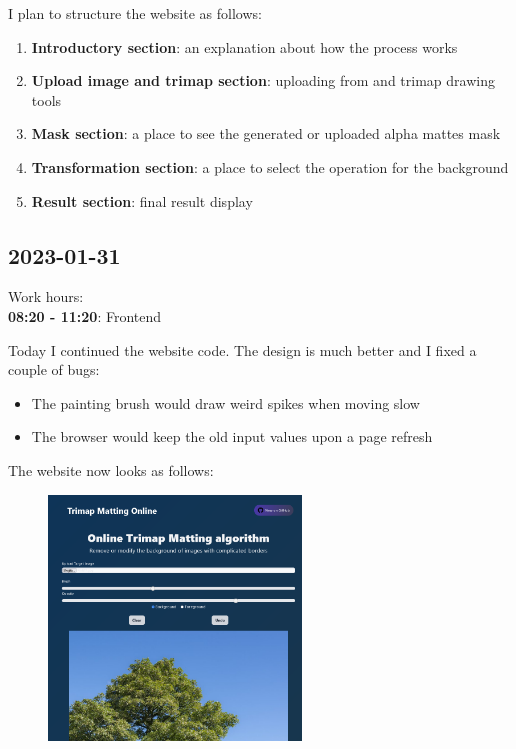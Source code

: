 \documentclass{article}
\begin{document}
I plan to structure the website as follows:
\begin{enumerate}
    \item \textbf{Introductory section}: an explanation about how the process works
    \item \textbf{Upload image and trimap section}: uploading from and trimap drawing tools
    \item \textbf{Mask section}: a place to see the generated or uploaded alpha mattes mask
    \item \textbf{Transformation section}: a place to select the operation for the background
    \item \textbf{Result section}: final result display
\end{enumerate}

\subsection{2023-01-31}

Work hours:\\
\textbf{08:20 - 11:20}: Frontend

Today I continued the website code. The design is much better
and I fixed a couple of bugs:
\begin{itemize}
    \item The painting brush would draw weird spikes when moving slow
    \item The browser would keep the old input values upon a page refresh
\end{itemize}
The website now looks as follows:
\begin{figure}[ht]
    \centering
    \includegraphics[width=0.60\textwidth]{web1.png}
\end{figure}

\pagebreak
\end{document}
